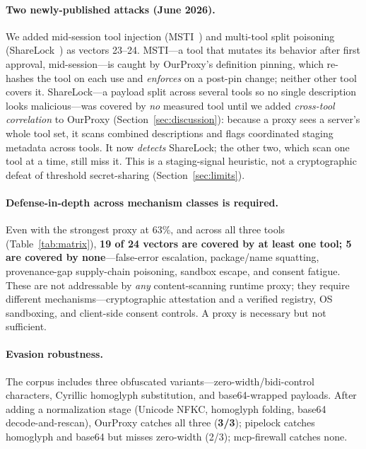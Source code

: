 \documentclass[sigconf,review,anonymous]{acmart}
\begin{document}
\paragraph{Two newly-published attacks (June 2026).} We added mid-session tool injection (MSTI~\cite{msti2606}) and multi-tool split poisoning (ShareLock~\cite{sharelock2606}) as vectors 23--24. MSTI---a tool that mutates its behavior after first approval, mid-session---is caught by OurProxy's definition pinning, which re-hashes the tool on each use and \emph{enforces} on a post-pin change; neither other tool covers it. ShareLock---a payload split across several tools so no single description looks malicious---was covered by \emph{no} measured tool until we added \emph{cross-tool correlation} to OurProxy (Section~\ref{sec:discussion}): because a proxy sees a server's whole tool set, it scans combined descriptions and flags coordinated staging metadata across tools. It now \emph{detects} ShareLock; the other two, which scan one tool at a time, still miss it. This is a staging-signal heuristic, not a cryptographic defeat of threshold secret-sharing (Section~\ref{sec:limits}).

\paragraph{Defense-in-depth across mechanism classes is required.} Even with the strongest proxy at 63\%, and across all three tools (Table~\ref{tab:matrix}), \textbf{19 of 24 vectors are covered by at least one tool; 5 are covered by none}---false-error escalation, package/name squatting, provenance-gap supply-chain poisoning, sandbox escape, and consent fatigue. These are not addressable by \emph{any} content-scanning runtime proxy; they require different mechanisms---cryptographic attestation and a verified registry, OS sandboxing, and client-side consent controls. A proxy is necessary but not sufficient.

\paragraph{Evasion robustness.} The corpus includes three obfuscated variants---zero-width/bidi-control characters, Cyrillic homoglyph substitution, and base64-wrapped payloads. After adding a normalization stage (Unicode NFKC, homoglyph folding, base64 decode-and-rescan), OurProxy catches all three (\textbf{3/3}); pipelock catches homoglyph and base64 but misses zero-width (2/3); mcp-firewall catches none.
\end{document}
